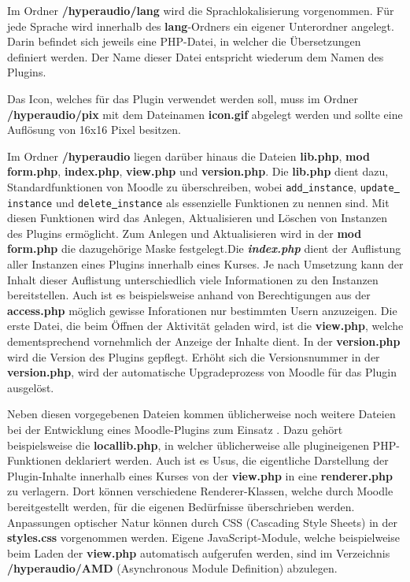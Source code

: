 Im Ordner \textbf{/hyperaudio/lang} wird die Sprachlokalisierung vorgenommen. Für jede Sprache wird innerhalb des \textbf{lang}-Ordners ein eigener Unterordner angelegt. Darin befindet sich jeweils eine PHP-Datei, in welcher die Übersetzungen definiert werden. Der Name dieser Datei entspricht wiederum dem Namen des Plugins.

Das Icon, welches für das Plugin  verwendet werden soll, muss im Ordner \textbf{/hyperaudio/pix} mit dem Dateinamen \textbf{icon.gif} abgelegt werden und sollte eine Auflösung von 16x16 Pixel besitzen.

Im Ordner \textbf{/hyperaudio} liegen darüber hinaus die Dateien \textbf{lib.php}, \textbf{mod\underline{{ }}form.php}, \textbf{index.php}, \textbf{view.php} und \textbf{version.php}. Die \textbf{lib.php} dient dazu, Standardfunktionen von Moodle zu überschreiben, wobei \texttt{add\underline{{ }}instance}, \texttt{update\underline{{ }}instance} und \texttt{delete\underline{{ }}instance} als essenzielle Funktionen zu nennen sind. Mit diesen Funktionen wird das Anlegen, Aktualisieren und Löschen von Instanzen des Plugins ermöglicht. Zum Anlegen und Aktualisieren wird in der \textbf{mod\underline{{ }}form.php} die dazugehörige Maske festgelegt.Die \textbf{\textit{index.php}} dient der Auflistung aller Instanzen eines Plugins innerhalb eines Kurses. Je nach Umsetzung kann der Inhalt dieser Auflistung unterschiedlich viele Informationen zu den Instanzen bereitstellen. Auch ist es beispielsweise anhand von Berechtigungen aus der \textbf{access.php} möglich gewisse Inforationen nur bestimmten Usern anzuzeigen. Die erste Datei, die beim Öffnen der Aktivität geladen wird, ist die \textbf{view.php}, welche dementsprechend vornehmlich der Anzeige der Inhalte dient. In der \textbf{version.php} wird die Version des Plugins gepflegt. Erhöht sich die Versionsnummer in der \textbf{version.php}, wird der automatische Upgradeprozess von Moodle für das Plugin ausgelöst.

Neben diesen vorgegebenen Dateien kommen üblicherweise noch weitere Dateien bei der Entwicklung eines Moodle-Plugins zum Einsatz \citep{wild2017moodle}. Dazu gehört beispielsweise die \textbf{locallib.php}, in welcher üblicherweise alle plugineigenen PHP-Funktionen deklariert werden. Auch ist es Usus, die eigentliche Darstellung der Plugin-Inhalte innerhalb eines Kurses von der \textbf{view.php} in eine \textbf{renderer.php} zu verlagern. Dort können verschiedene Renderer-Klassen, welche durch Moodle bereitgestellt werden, für die eigenen Bedürfnisse überschrieben werden. Anpassungen optischer Natur können durch CSS (Cascading Style Sheets) in der \textbf{styles.css} vorgenommen werden. Eigene JavaScript-Module, welche beispielweise beim Laden der \textbf{view.php} automatisch aufgerufen werden, sind im Verzeichnis \textbf{/hyperaudio/AMD} (Asynchronous Module Definition) abzulegen.

